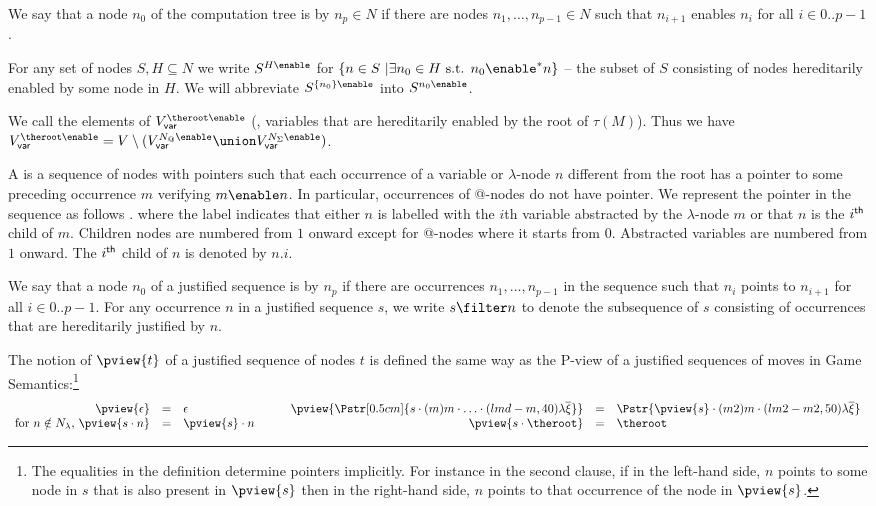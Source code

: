 We say that a node $n_0$ of the computation tree is
 by $n_p \in N$ if there are nodes
$n_1,\ldots, n_{p-1} \in N$ such that $n_{i+1}$ enables $n_{i}$ for
all $i\in 0..p-1$.

For any set of nodes $S, H \subseteq N$ we write $S^{H\enable}$ for
$\{ n \in S \ | \exists n_0 \in H \mbox{
s.t. }n_0  \enable^* n \}$ -- the subset of $S$ consisting of nodes
hereditarily enabled by some node in $H$. We will abbreviate
$S^{\{n_0\}\enable}$ into $S^{n_0\enable}$.

We call  the elements of $V_{\sf
var}^{\theroot\enable}$ (\ie, variables that are hereditarily enabled
by the root of $\tau(M)$). Thus we have $V_{\sf
var}^{\theroot\enable} = V \setminus ( V_{\sf var}^{N_@\enable}
\union V_{\sf var}^{N_\Sigma\enable})$.

A  is a sequence of nodes with
pointers such that each occurrence of a variable or $\lambda$-node
$n$ different from the root has a pointer to some preceding
occurrence $m$ verifying $m \enable n$. In particular, occurrences
of @-nodes do not have pointer. We represent the pointer in the
sequence as follows .
 where the label indicates that either $n$ is labelled with the $i$th variable
abstracted by the $\lambda$-node $m$ or that $n$ is the $i^{\sf th}$
child of $m$.  Children nodes are numbered from $1$ onward except for
@-nodes where it starts from $0$. Abstracted variables are numbered
from $1$ onward. The $i^{\sf th}$ child of $n$ is denoted by $n.i$.

We say that a node $n_0$ of a justified sequence is
 by $n_p$ if there are occurrences $n_1,
\ldots, n_{p-1}$ in the sequence such that $n_i$ points to $n_{i+1}$
for all $i\in 0..p-1$. For any occurrence $n$ in a justified
sequence $s$, we write $s \filter n$ to denote the subsequence of
$s$ consisting of occurrences that are hereditarily justified by
$n$.


The notion of  $\pview{t}$ of a justified sequence of
nodes $t$ is defined the same way as the P-view of a justified
sequences of moves in Game Semantics:\footnote{ The equalities in the
  definition determine pointers implicitly. For instance in the second
  clause, if in the left-hand side, $n$ points to some node in $s$
  that is also present in $\pview{s}$ then in the right-hand side, $n$
  points to that occurrence of the node in $\pview{s}$.}
$$\begin{array}{rclrcl}
\pview{\epsilon} &=&  \epsilon
& \pview{\Pstr[0.5cm]{ s \cdot (m) m \cdot \ldots \cdot (lmd-m,40){\lambda\overline{\xi}}
}}
 &=& \Pstr{
\pview{s} \cdot (m2) m \cdot (lm2-m2,50) {\lambda \overline{\xi}} } \\
\mbox{for $n \notin N_\lambda$, } \pview{s \cdot n }  &=&  \pview{s} \cdot n \qquad
& \pview{s \cdot \theroot }  &=&  \theroot
\end{array}$$

